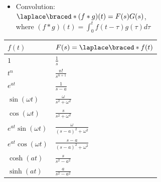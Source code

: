 \begin{multicols}{2}
\begin{itemize}
  \vspace{0.5em}\hrule\vspace{0.5em}

\item Convolution: \\ $\laplace\braced*{(f*g)(t)} = F(s)G(s)$,
  \\where \((f * g)(t) = \int_{0}^{t}f(t-\tau)g(\tau)d\tau\)

\end{itemize}
\everymath{\displaystyle}
  \begin{center}
\renewcommand{\arraystretch}{2}
\begin{tabular}{ |>{\centering\arraybackslash}m{1in}|>{\centering\arraybackslash}m{1in}|}
$f(t)$ & $F(s) = \laplace\braced*{f(t)}$\\\hline
$1$ & $\frac{1}{s}$ \\
$t^n$ & $\frac{n!}{s^{n+1}}$ \\
$e^{at}$ & $\frac{1}{s-a}$ \\
$\sin(\omega t)$ & $\frac{\omega}{s^2+\omega^2}$ \\
$\cos(\omega t)$ & $\frac{s}{s^2+\omega^2}$ \\
$e^{at}\sin(\omega t)$ & $\frac{\omega}{(s-a)^2+\omega^2}$ \\
$e^{at}\cos(\omega t)$ & $\frac{s-a}{(s-a)^2+\omega^2}$ \\
$\cosh(at)$ & $\frac{s}{s^2-a^2}$ \\
$\sinh(at)$ & $\frac{a}{s^2-a^2}$ \\
\end{tabular}
\end{center}

\end{multicols}

\vfill

